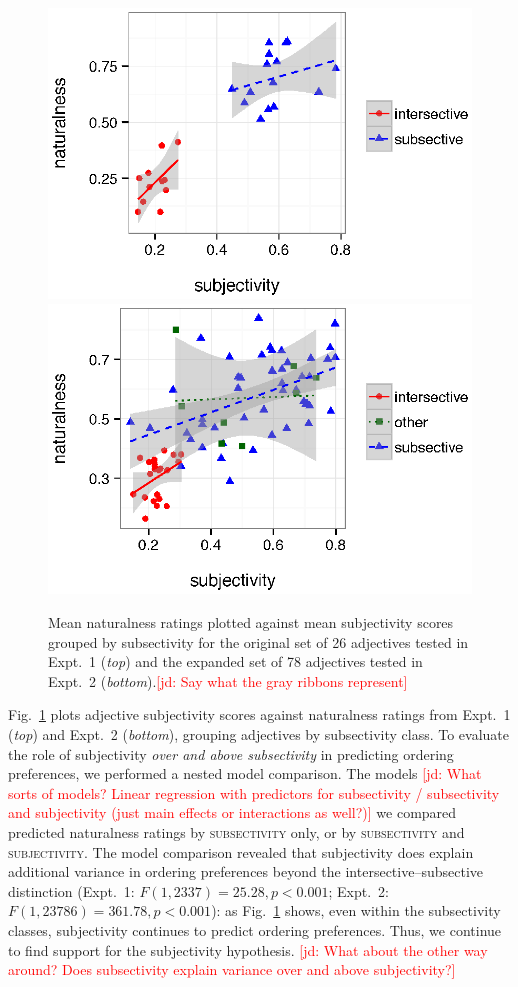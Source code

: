 \documentclass[12pt]{article}
\newcommand{\jd}[1]{\textcolor{red}{[jd: #1]}}
\begin{document}
\renewcommand\thefigure{S.\arabic{figure}}
\begin{figure}
	\centering\includegraphics[width=4.5in]{plots/expt1-subjectivity-subsectivity.eps}\\\includegraphics[width=4.5in]{plots/expt3-subjectivity-subsectivity.eps}
	\caption{Mean naturalness ratings plotted against mean subjectivity scores grouped by subsectivity for the original set of 26 adjectives tested in Expt.~1 (\emph{top}) and the expanded set of 78 adjectives tested in Expt.~2 (\emph{bottom}).\jd{Say what the gray ribbons represent}}\label{fig:subsectivity}
\end{figure}

Fig.~\ref{fig:subsectivity} plots adjective subjectivity scores against naturalness ratings from Expt.~1 (\emph{top}) and Expt.~2 (\emph{bottom}), grouping adjectives by subsectivity class. To evaluate the role of subjectivity \emph{over and above subsectivity} in predicting ordering preferences, we performed a nested model comparison. The models \jd{What sorts of models? Linear regression with predictors for subsectivity / subsectivity and subjectivity (just main effects or interactions as well?)} we compared predicted naturalness ratings by \textsc{subsectivity} only, or by \textsc{subsectivity} and \textsc{subjectivity}. The model comparison revealed that subjectivity does explain additional variance in ordering preferences beyond the intersective--subsective distinction (Expt.~1: $F(1,2337)=25.28, p<0.001$; Expt.~2: $F(1,23786)=361.78, p<0.001$): as Fig.~\ref{fig:subsectivity} shows, even within the subsectivity classes, subjectivity continues to predict ordering preferences. Thus, we continue to find support for the subjectivity hypothesis. \jd{What about the other way around? Does subsectivity explain variance over and above subjectivity?}
\end{document}

